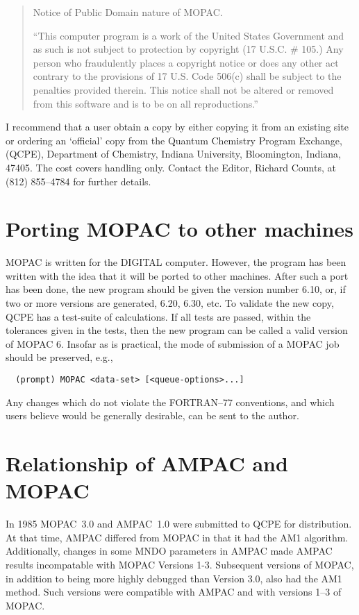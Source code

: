 \begin{quote}
          Notice of Public Domain nature of MOPAC.

         ``This computer program is a work of the United States 
          Government and as such is not subject to protection by 
          copyright (17 U.S.C. \# 105.)  Any person who fraudulently 
          places a copyright notice or does any other act contrary 
          to the provisions of 17 U.S. Code 506(c) shall be subject 
          to the penalties provided therein.  This notice shall not 
          be altered or removed from this software and is to be on 
          all reproductions.''
\end{quote}

   I recommend that a user obtain a  copy  by  either  copying  it  from  an
   existing  site  or ordering an `official' copy from the Quantum Chemistry
   Program Exchange, (QCPE), Department of  Chemistry,  Indiana  University,
   Bloomington, Indiana, 47405.  The cost 
   covers handling only.  Contact the
   Editor, Richard Counts, at (812) 855--4784 for further details.
         
\section{Porting MOPAC to other machines}
 MOPAC is written for the DIGITAL  computer.  However, the program
 has  been written with the idea that it will be ported to other machines.
 After such a port has been done, the new  program  should  be  given  the
 version  number  6.10,  or,  if two or more versions are generated, 6.20,
 6.30,  etc.   To  validate  the  new  copy,  QCPE  has  a  test-suite  of
 calculations.   If  all  tests are passed, within the tolerances given in
 the tests, then the new program can be called a valid version of MOPAC 6.
 Insofar  as is practical, the mode of submission of a MOPAC job should be
 preserved, e.g.,
\begin{verbatim}   
  (prompt) MOPAC <data-set> [<queue-options>...]
\end{verbatim}
 
      Any changes which do not violate  the FORTRAN--77  conventions,  and
 which  users  believe  would  be  generally desirable, can be sent to the
 author.

\section{Relationship of AMPAC and MOPAC}
   In 1985  MOPAC~3.0  and  AMPAC~1.0  were  submitted  to  QCPE  for
   distribution.  At that time, AMPAC differed from MOPAC in that it had the
   AM1 algorithm.  Additionally, changes in some MNDO  parameters  in  AMPAC
   made  AMPAC  results  incompatable  with  MOPAC Versions 1-3.  Subsequent
   versions of MOPAC, in addition to being more highly debugged than Version
   3.0,  also  had the AM1 method.  Such versions were compatible with AMPAC
   and with versions 1--3 of MOPAC.

